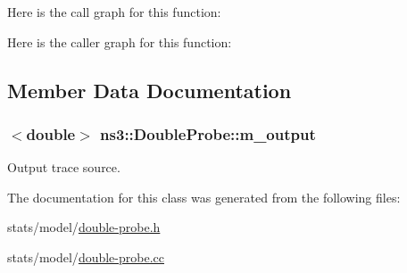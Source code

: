Here is the call graph for this function\+:




Here is the caller graph for this function\+:




\subsection{Member Data Documentation}
\subsubsection[{\texorpdfstring{m\+\_\+output}{m_output}}]{$<$double$>$ ns3\+::\+Double\+Probe\+::m\+\_\+output\hspace{0.3cm}{\ttfamily [private]}}\hypertarget{classns3_1_1DoubleProbe_ae07e0f2547fae60abcaab3c13eb138d3}{}\label{classns3_1_1DoubleProbe_ae07e0f2547fae60abcaab3c13eb138d3}


Output trace source. 



The documentation for this class was generated from the following files\+:\begin{DoxyCompactItemize}
\item 
stats/model/\hyperlink{double-probe_8h}{double-\/probe.\+h}\item 
stats/model/\hyperlink{double-probe_8cc}{double-\/probe.\+cc}\end{DoxyCompactItemize}
